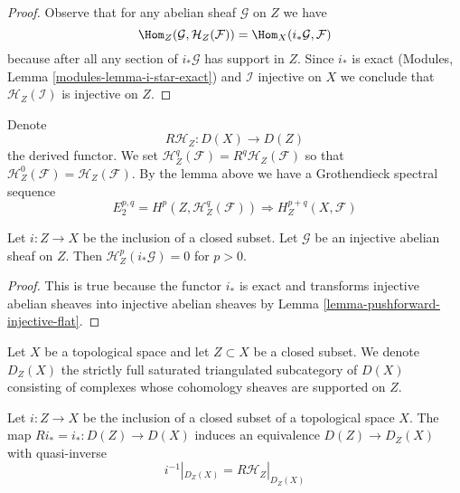 \begin{proof}
Observe that for any abelian sheaf $\mathcal{G}$ on $Z$
we have
$$
\Hom_Z(\mathcal{G}, \mathcal{H}_Z(\mathcal{F})) =
\Hom_X(i_*\mathcal{G}, \mathcal{F})
$$
because after all any section of $i_*\mathcal{G}$ has support in $Z$.
Since $i_*$ is exact (Modules, Lemma \ref{modules-lemma-i-star-exact})
and $\mathcal{I}$ injective on $X$ we conclude that
$\mathcal{H}_Z(\mathcal{I})$ is injective on $Z$.
\end{proof}

\noindent
Denote
$$
R\mathcal{H}_Z : D(X) \longrightarrow D(Z)
$$
the derived functor. We set
$\mathcal{H}^q_Z(\mathcal{F}) = R^q\mathcal{H}_Z(\mathcal{F})$ so that
$\mathcal{H}^0_Z(\mathcal{F}) = \mathcal{H}_Z(\mathcal{F})$.
By the lemma above we have a Grothendieck spectral sequence
$$
E_2^{p, q} = H^p(Z, \mathcal{H}^q_Z(\mathcal{F}))
\Rightarrow H^{p + q}_Z(X, \mathcal{F})
$$

\begin{lemma}
\label{lemma-cohomology-with-support-sheaf-on-support}
Let $i : Z \to X$ be the inclusion of a closed subset.
Let $\mathcal{G}$ be an injective abelian sheaf on $Z$.
Then $\mathcal{H}^p_Z(i_*\mathcal{G}) = 0$ for $p > 0$.
\end{lemma}

\begin{proof}
This is true because the functor $i_*$ is exact and transforms
injective abelian sheaves into injective abelian sheaves by Lemma
\ref{lemma-pushforward-injective-flat}.
\end{proof}

\noindent
Let $X$ be a topological space and let $Z \subset X$ be a closed subset.
We denote $D_Z(X)$ the strictly full saturated triangulated subcategory of
$D(X)$ consisting of complexes whose cohomology sheaves are supported on
$Z$.

\begin{lemma}
\label{lemma-complexes-with-support-on-closed}
Let $i : Z \to X$ be the inclusion of a closed subset of a topological
space $X$. The map $Ri_* = i_* : D(Z) \to D(X)$ induces an equivalence
$D(Z) \to D_Z(X)$ with quasi-inverse
$$
i^{-1}|_{D_Z(X)} = R\mathcal{H}_Z|_{D_Z(X)}
$$
\end{lemma}

